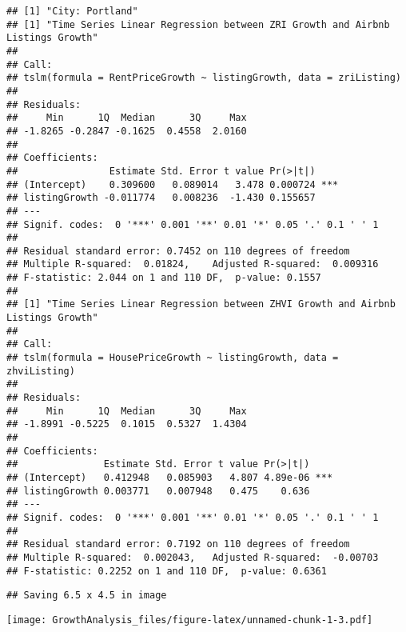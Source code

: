 \documentclass[
]{article}
\begin{document}
\begin{verbatim}
## [1] "City: Portland"
## [1] "Time Series Linear Regression between ZRI Growth and Airbnb Listings Growth"
## 
## Call:
## tslm(formula = RentPriceGrowth ~ listingGrowth, data = zriListing)
## 
## Residuals:
##     Min      1Q  Median      3Q     Max 
## -1.8265 -0.2847 -0.1625  0.4558  2.0160 
## 
## Coefficients:
##                Estimate Std. Error t value Pr(>|t|)    
## (Intercept)    0.309600   0.089014   3.478 0.000724 ***
## listingGrowth -0.011774   0.008236  -1.430 0.155657    
## ---
## Signif. codes:  0 '***' 0.001 '**' 0.01 '*' 0.05 '.' 0.1 ' ' 1
## 
## Residual standard error: 0.7452 on 110 degrees of freedom
## Multiple R-squared:  0.01824,    Adjusted R-squared:  0.009316 
## F-statistic: 2.044 on 1 and 110 DF,  p-value: 0.1557
## 
## [1] "Time Series Linear Regression between ZHVI Growth and Airbnb Listings Growth"
## 
## Call:
## tslm(formula = HousePriceGrowth ~ listingGrowth, data = zhviListing)
## 
## Residuals:
##     Min      1Q  Median      3Q     Max 
## -1.8991 -0.5225  0.1015  0.5327  1.4304 
## 
## Coefficients:
##               Estimate Std. Error t value Pr(>|t|)    
## (Intercept)   0.412948   0.085903   4.807 4.89e-06 ***
## listingGrowth 0.003771   0.007948   0.475    0.636    
## ---
## Signif. codes:  0 '***' 0.001 '**' 0.01 '*' 0.05 '.' 0.1 ' ' 1
## 
## Residual standard error: 0.7192 on 110 degrees of freedom
## Multiple R-squared:  0.002043,   Adjusted R-squared:  -0.00703 
## F-statistic: 0.2252 on 1 and 110 DF,  p-value: 0.6361
\end{verbatim}

\begin{verbatim}
## Saving 6.5 x 4.5 in image
\end{verbatim}

\texttt{[image: GrowthAnalysis\_files/figure-latex/unnamed-chunk-1-3.pdf]}
\end{document}
